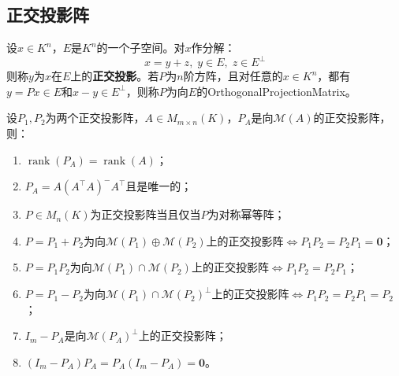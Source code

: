 \subsection{正交投影阵}
\begin{definition}
	设$x\in K^n$，$E$是$K^n$的一个子空间。对$x$作分解：
	\begin{equation*}
		x=y+z,\;y\in E,\;z\in E^\perp
	\end{equation*}
	则称$y$为$x$在$E$上的\textbf{正交投影}。若$P$为$n$阶方阵，且对任意的$x\in K^n$，都有$y=Px\in E$和$x-y\in E^\perp$，则称$P$为向$E$的\gls{OrthogonalProjectionMatrix}。
\end{definition}
\begin{property}\label{prop:OrthogonalProjectionMat}
	设$P_1,P_2$为两个正交投影阵，$A\in M_{m\times n}(K)$，$P_A$是向$\mathcal{M}(A)$的正交投影阵，则：
	\begin{enumerate}
		\item $\operatorname{rank}(P_A)=\operatorname{rank}(A)$；
		\item $P_A=A(A^{\top}A)^-A^{\top}$且是唯一的；
		\item $P\in M_{n}(K)$为正交投影阵当且仅当$P$为对称幂等阵；
		\item $P=P_1+P_2$为向$\mathcal{M}(P_1)\oplus\mathcal{M}(P_2)$上的正交投影阵$\iff P_1P_2=P_2P_1=\mathbf{0}$；
		\item $P=P_1P_2$为向$\mathcal{M}(P_1)\cap\mathcal{M}(P_2)$上的正交投影阵$\iff P_1P_2=P_2P_1$；
		\item $P=P_1-P_2$为向$\mathcal{M}(P_1)\cap\mathcal{M}(P_2)^\perp$上的正交投影阵$\iff P_1P_2=P_2P_1=P_2$；
		\item $I_m-P_A$是向$\mathcal{M}(P_A)^\perp$上的正交投影阵；
		\item $(I_m-P_A)P_A=P_A(I_m-P_A)=\mathbf{0}$。
	\end{enumerate}
\end{property}

